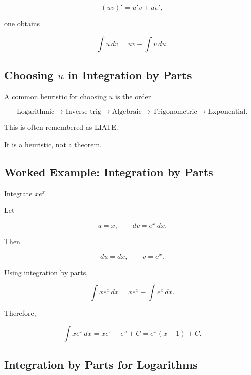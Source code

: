 \[
(uv)'
=
u'v+uv',
\]

one obtains

\[
\boxed{
\int u\,dv
=
uv
-
\int v\,du.
}
\]

\subsection{Choosing \(u\) in Integration by Parts}
\label{subsec:liate-integration-by-parts}

A common heuristic for choosing \(u\) is the order

\[
\boxed{
\text{Logarithmic}
\rightarrow
\text{Inverse trig}
\rightarrow
\text{Algebraic}
\rightarrow
\text{Trigonometric}
\rightarrow
\text{Exponential}.
}
\]

This is often remembered as LIATE.

It is a heuristic, not a theorem.

\subsection{Worked Example: Integration by Parts}
\label{subsec:worked-integration-by-parts}

\begin{workedexamplebox}{Integrate \(xe^x\)}

Let

\[
u=x,
\qquad
dv=e^x\,dx.
\]

Then

\[
du=dx,
\qquad
v=e^x.
\]

Using integration by parts,

\[
\int xe^x\,dx
=
xe^x-\int e^x\,dx.
\]

Therefore,

\begin{answerbox}
\[
\boxed{
\int xe^x\,dx
=
xe^x-e^x+C
=
e^x(x-1)+C.
}
\]
\end{answerbox}

\end{workedexamplebox}

\subsection{Integration by Parts for Logarithms}
\label{subsec:integration-by-parts-logarithm}

